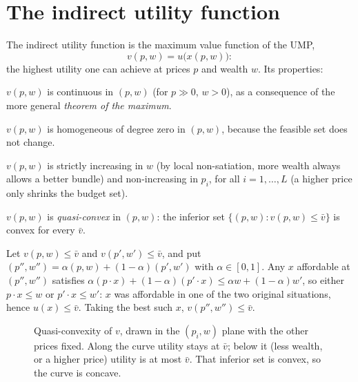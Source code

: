 \documentclass[11pt]{article}
\begin{document}
\section{The indirect utility function}

The indirect utility function is the maximum value function of the UMP,
\[ v(p,w)=u\bigl(x(p,w)\bigr): \]
the highest utility one can achieve at prices $p$ and wealth $w$. Its properties:
\begin{flatlist}
  \item $v(p,w)$ is continuous in $(p,w)$ (for $p\gg0$, $w>0$), as a consequence
        of the more general \emph{theorem of the maximum}.
  \item $v(p,w)$ is homogeneous of degree zero in $(p,w)$, because the feasible set
        does not change.
  \item $v(p,w)$ is strictly increasing in $w$ (by local non-satiation, more
        wealth always allows a better bundle) and non-increasing in $p_i$, for all
        $i=1,\dots,L$ (a higher price only shrinks the budget set).
  \item $v(p,w)$ is \emph{quasi-convex} in $(p,w)$: the inferior set
        $\{(p,w) : v(p,w)\le\bar v\}$ is convex for every $\bar v$.
\end{flatlist}

 Let $v(p,w)\le\bar v$ and $v(p',w')\le\bar v$, and put
$(p'',w'')=\alpha(p,w)+(1-\alpha)(p',w')$ with $\alpha\in[0,1]$. Any $x$ affordable
at $(p'',w'')$ satisfies
$\alpha(p\cdot x)+(1-\alpha)(p'\cdot x)\le\alpha w+(1-\alpha)w'$, so either
$p\cdot x\le w$ or $p'\cdot x\le w'$: $x$ was affordable in one of the two original
situations, hence $u(x)\le\bar v$. Taking the best such $x$,
$v(p'',w'')\le\bar v$.

\begin{figure}[ht]
\centering
{}
\caption{Quasi-convexity of $v$, drawn in the $(p_i,w)$ plane with the other prices
fixed. Along the curve utility stays at $\bar v$; below it (less wealth, or a higher
price) utility is at most $\bar v$. That inferior set is convex, so the curve is
concave.}
\end{figure}
\end{document}
